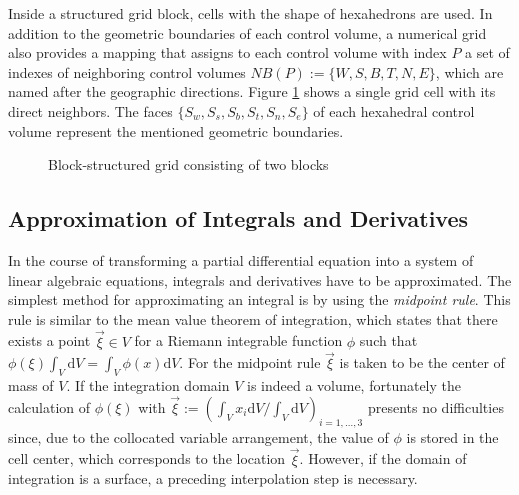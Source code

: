 Inside a structured grid block, cells with the shape of hexahedrons are used. In addition to the geometric boundaries of each control volume, a numerical grid also provides a mapping that assigns to each control volume with index \(P\) a set of indexes of neighboring control volumes \(NB(P):=\{W,S,B,T,N,E\}\), which are named after the geographic directions. Figure \ref{fig:blockstruc} shows a single grid cell with its direct neighbors. The faces \(\{S_w,S_s,S_b,S_t,S_n,S_e\}\) of each hexahedral control volume represent the mentioned geometric boundaries. 

\begin{figure}[h]
  \hfil
  \caption{Block-structured grid consisting of two blocks}
  \label{fig:blockstruc}
 \end{figure}

\subsection{Approximation of Integrals and Derivatives}
\label{sec:approxintegralderivative}

In the course of transforming a partial differential equation into a system of linear algebraic equations, integrals and derivatives have to be approximated. The simplest method for approximating an integral is by using the \emph{midpoint rule}. This rule is similar to the mean value theorem of integration, which states that there exists a point \(\vec{\xi} \in V\) for a Riemann integrable function \(\phi\) such that \(\textstyle \phi(\xi) \int_V \mathrm{d}V = \int_V \phi(x) \mathrm{d}V\). For the midpoint rule \(\vec{\xi}\) is taken to be the center of mass of \(V\). If the integration domain \(V\) is indeed a volume, fortunately the calculation of \(\phi(\mathbb{\xi})\) with \(\textstyle \vec{\xi} := \left({ \int_V x_i \mathrm{d}V }/{ \int_V \mathrm{d}V } \right)_{i = 1,\dots,3}\) presents no difficulties since, due to the collocated variable arrangement, the value of \(\phi\) is stored in the cell center, which corresponds to the location \(\vec{\xi}\). However, if the domain of integration is a surface, a preceding interpolation step is necessary.

